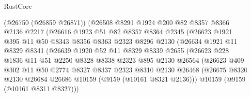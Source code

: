 \begin{lexlean}{RustCore}
\begin{coremodule}
                    (@26750 (@26859 @26871))
                    (@26508
                      @8291
                      @1924
                      @200
                      @82
                      @8357
                      @8366
                      @2136
                      @2217
                      (@26616
                        @1923
                        @51
                        @82
                        @8357
                        @8364
                        @2345
                        (@26623
                          @1921
                          @395
                          @11
                          @50
                          @8343
                          @8356
                          @8363
                          @2323
                          @8296
                          @2130
                          (@26634
                            @1921
                            @11
                            @8329
                            @8341
                            (@26639
                              @1920
                              @52
                              @11
                              @8329
                              @8339
                              @2655
                              (@26623
                                @228
                                @1836
                                @11
                                @51
                                @2250
                                @8328
                                @8338
                                @2323
                                @895
                                @2130
                                @26564
                                (@26623
                                  @409
                                  @302
                                  @11
                                  @50
                                  @2774
                                  @8327
                                  @8337
                                  @2323
                                  @8310
                                  @2130
                                  @26468
                                  (@26675
                                    @8320
                                    @2130
                                    @26684
                                    @26686
                                    @10159
                                    (@9159 (@10161 @8321 @2136)))
                                  @10159
                                  (@9159 (@10161 @8311 @8327)))

\end{coremodule}
\end{lexlean}

